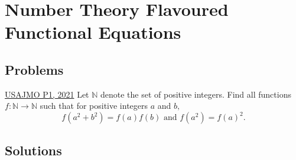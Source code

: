 \section{Number Theory Flavoured Functional Equations}
\subsection{Problems}
\begin{problem}{1}{\href{https://artofproblemsolving.com/community/q2h2529938p34791441}{USAJMO P1, 2021}}
	Let $\mathbb{N}$ denote the set of positive integers. Find all functions $f : \mathbb{N} \rightarrow \mathbb{N}$ such that for positive integers $a$ and $b,$\[f(a^2 + b^2) = f(a)f(b) \text{ and } f(a^2) = f(a)^2.\]
\end{problem}

\newpage
\subsection{Solutions}
